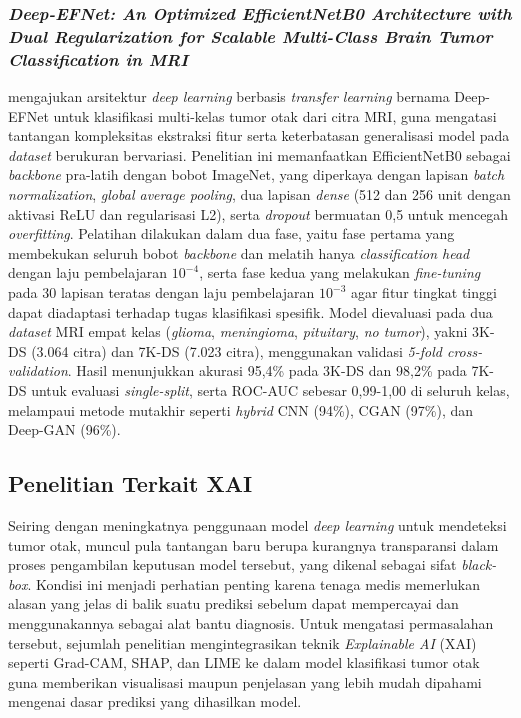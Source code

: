 \subsubsection{\textit{Deep-EFNet: An Optimized EfficientNetB0 Architecture with Dual Regularization for Scalable Multi-Class Brain Tumor Classification in MRI}}
\label{subsubsec:efnet}
\textcite{alshaari2025deepefnet} mengajukan arsitektur \textit{deep learning} berbasis \textit{transfer learning} bernama Deep-EFNet untuk klasifikasi multi-kelas tumor otak dari citra MRI, guna mengatasi tantangan kompleksitas ekstraksi fitur serta keterbatasan generalisasi model pada \textit{dataset} berukuran bervariasi. Penelitian ini memanfaatkan EfficientNetB0 sebagai \textit{backbone} pra-latih dengan bobot ImageNet, yang diperkaya dengan lapisan \textit{batch normalization}, \textit{global average pooling}, dua lapisan \textit{dense} (512 dan 256 unit dengan aktivasi ReLU dan regularisasi L2), serta \textit{dropout} bermuatan 0,5 untuk mencegah \textit{overfitting}. Pelatihan dilakukan dalam dua fase, yaitu fase pertama yang membekukan seluruh bobot \textit{backbone} dan melatih hanya \textit{classification head} dengan laju pembelajaran $10^{-4}$, serta fase kedua yang melakukan \textit{fine-tuning} pada 30 lapisan teratas dengan laju pembelajaran $10^{-3}$ agar fitur tingkat tinggi dapat diadaptasi terhadap tugas klasifikasi spesifik. Model dievaluasi pada dua \textit{dataset} MRI empat kelas (\textit{glioma}, \textit{meningioma}, \textit{pituitary}, \textit{no tumor}), yakni 3K-DS (3.064 citra) dan 7K-DS (7.023 citra), menggunakan validasi \textit{5-fold cross-validation}. Hasil menunjukkan akurasi 95,4\% pada 3K-DS dan 98,2\% pada 7K-DS untuk evaluasi \textit{single-split}, serta ROC-AUC sebesar 0,99-1,00 di seluruh kelas, melampaui metode mutakhir seperti \textit{hybrid} CNN (94\%), CGAN (97\%), dan Deep-GAN (96\%).

\subsection{Penelitian Terkait XAI}
Seiring dengan meningkatnya penggunaan model \textit{deep learning} untuk mendeteksi tumor otak, muncul pula tantangan baru berupa kurangnya transparansi dalam proses pengambilan keputusan model tersebut, yang dikenal sebagai sifat \textit{black-box}. Kondisi ini menjadi perhatian penting karena tenaga medis memerlukan alasan yang jelas di balik suatu prediksi sebelum dapat mempercayai dan menggunakannya sebagai alat bantu diagnosis. Untuk mengatasi permasalahan tersebut, sejumlah penelitian mengintegrasikan teknik \textit{Explainable AI} (XAI) seperti Grad-CAM, SHAP, dan LIME ke dalam model klasifikasi tumor otak guna memberikan visualisasi maupun penjelasan yang lebih mudah dipahami mengenai dasar prediksi yang dihasilkan model.

